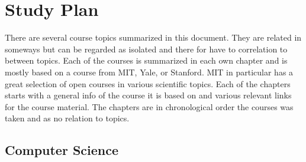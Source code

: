 \documentclass{book}
\author{Anton Augustsson}
\begin{document}
\maketitle
\newpage
\tableofcontents
\newpage



\chapter{Study Plan}
There are several course topics summarized in this document.
They are related in someways but can be regarded as isolated and there for have to correlation to between topics.
Each of the courses is summarized in each own chapter and is mostly based on a course from MIT, Yale, or Stanford.
MIT in particular has a great selection of open courses in various scientific topics. Each of the chapters starts
with a general info of the course it is based on and various relevant links for the course material.
The chapters are in chronological order the courses was taken and as no relation to topics.
\newpage

\section{Computer Science}
\resizebox{0.9\textwidth}{!}{} \newpage


\newcommand{\pathCS}{chapters}

\newcommand{\pathECPP}{\pathCS/Embedded-C++}  \newpage
\newcommand{\pathCMAKE}{\pathCS/CMake}  \newpage
\newcommand{\pathGIT}{\pathCS/Git}  \newpage

 

\newpage
\printbibliography
\end{document}
